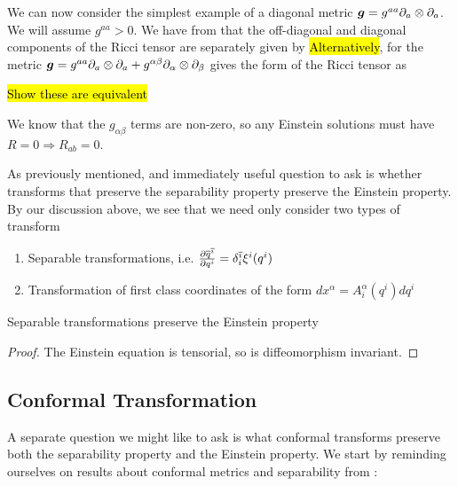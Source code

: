 \documentclass{article}
\begin{document}
We can now consider the simplest example of a diagonal metric $\bm{g} = g^{aa} \del_a \otimes \del_a$. We will assume $g^{aa} > 0$. We have from \cite{Win1996} that the off-diagonal and diagonal components of the Ricci tensor are separately given by 
\hl{Alternatively}, for the metric $\bm{g} = g^{aa}\del_a \otimes \del_a + g^{\alpha\beta}\del_\alpha \otimes \del_\beta$ \cite{Benenti1980} gives the form of the Ricci tensor as 
\begin{ex}
	\hl{Show these are equivalent}
\end{ex}

We know that the $g_{\alpha\beta}$ terms are non-zero, so any Einstein solutions must have $R=0 \Rightarrow R_{ab} = 0$. 


As previously mentioned, and immediately useful question to ask is whether transforms that preserve the separability property preserve the Einstein property. By our discussion above, we see that we need only consider two types of transform 
\begin{enumerate}
    \item Separable transformations, i.e. $\pd[\bar{q}^{\bar{\imath}}]{q^i} = \delta_i^{\bar{\imath}}\xi^i(q^i)$
    \item Transformation of first class coordinates of the form $dx^\alpha = A^\alpha_i(q^i) dq^i $
\end{enumerate}

\begin{prop}
Separable transformations preserve the Einstein property
\end{prop}
\begin{proof}
The Einstein equation is tensorial, so is diffeomorphism invariant. 
\end{proof}

\subsection{Conformal Transformation}
A separate question we might like to ask is what conformal transforms preserve both the separability property and the Einstein property. We start by reminding ourselves on results about conformal metrics and separability from \cite{Benenti2005}:
\end{document}
